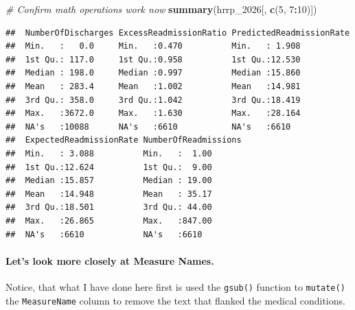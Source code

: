 \documentclass[
]{article}
\newenvironment{Shaded}{\begin{snugshade}}{\end{snugshade}}
\newcommand{\AttributeTok}[1]{\textcolor[rgb]{0.13,0.29,0.53}{#1}}
\newcommand{\CommentTok}[1]{\textcolor[rgb]{0.56,0.35,0.01}{\textit{#1}}}
\newcommand{\DecValTok}[1]{\textcolor[rgb]{0.00,0.00,0.81}{#1}}
\newcommand{\FunctionTok}[1]{\textcolor[rgb]{0.13,0.29,0.53}{\textbf{#1}}}
\newcommand{\NormalTok}[1]{#1}
\newcommand{\OtherTok}[1]{\textcolor[rgb]{0.56,0.35,0.01}{#1}}
\newcommand{\SpecialCharTok}[1]{\textcolor[rgb]{0.81,0.36,0.00}{\textbf{#1}}}
\newcommand{\StringTok}[1]{\textcolor[rgb]{0.31,0.60,0.02}{#1}}
\begin{document}
\begin{Shaded}
\begin{Highlighting}[]
\CommentTok{\# Confirm math operations work now}
\FunctionTok{summary}\NormalTok{(hrrp\_2026[, }\FunctionTok{c}\NormalTok{(}\DecValTok{5}\NormalTok{, }\DecValTok{7}\SpecialCharTok{:}\DecValTok{10}\NormalTok{)])}
\end{Highlighting}
\end{Shaded}

\begin{verbatim}
##  NumberOfDischarges ExcessReadmissionRatio PredictedReadmissionRate
##  Min.   :   0.0     Min.   :0.470          Min.   : 1.908          
##  1st Qu.: 117.0     1st Qu.:0.958          1st Qu.:12.530          
##  Median : 198.0     Median :0.997          Median :15.860          
##  Mean   : 283.4     Mean   :1.002          Mean   :14.981          
##  3rd Qu.: 358.0     3rd Qu.:1.042          3rd Qu.:18.419          
##  Max.   :3672.0     Max.   :1.630          Max.   :28.164          
##  NA's   :10088      NA's   :6610           NA's   :6610            
##  ExpectedReadmissionRate NumberOfReadmissions
##  Min.   : 3.088          Min.   :  1.00      
##  1st Qu.:12.624          1st Qu.:  9.00      
##  Median :15.857          Median : 19.00      
##  Mean   :14.948          Mean   : 35.17      
##  3rd Qu.:18.501          3rd Qu.: 44.00      
##  Max.   :26.865          Max.   :847.00      
##  NA's   :6610            NA's   :6610
\end{verbatim}

\paragraph{Let's look more closely at Measure
Names.}\label{lets-look-more-closely-at-measure-names.}

Notice, that what I have done here first is used the \texttt{gsub()}
function to \texttt{mutate()} the \texttt{MeasureName} column to remove
the text that flanked the medical conditions.

\begin{Shaded}
\end{Shaded}
\end{document}
